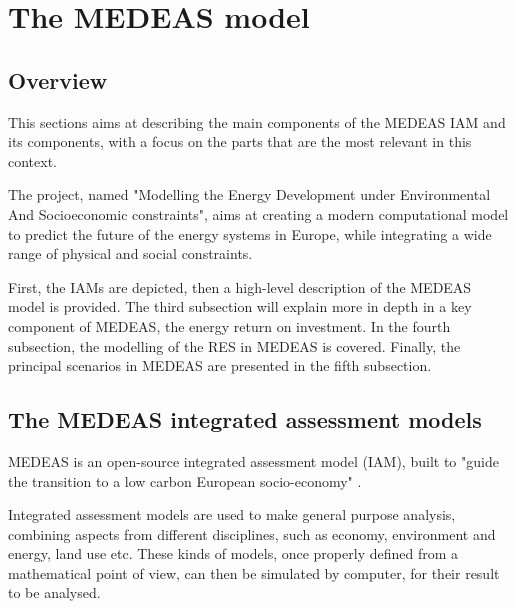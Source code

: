 \section{The MEDEAS model}

\subsection{Overview}

This sections aims at describing the main components of the MEDEAS IAM and its components, with a focus on the parts that are the most relevant in this context.

The project, named "Modelling the Energy Development under Environmental And Socioeconomic constraints", aims at creating a modern computational model to predict the future of the energy systems in Europe, while integrating a wide range of physical and social constraints.

First, the IAMs are depicted, then a high-level description of the MEDEAS model is provided. The third subsection will explain more in depth in a key component of MEDEAS, the energy return on investment. In the fourth subsection, the modelling of the RES in MEDEAS is covered. Finally, the principal scenarios in MEDEAS are presented in the fifth subsection.


\subsection{The MEDEAS integrated assessment models}

MEDEAS is an open-source integrated assessment model (IAM), built to "guide the transition to a low carbon European socio-economy" \cite{medeas-website}.

Integrated assessment models are used to make general purpose analysis, combining aspects from different disciplines, such as economy, environment and energy, land use etc. These kinds of models, once properly defined from a mathematical point of view, can then be simulated by computer, for their result to be analysed.

